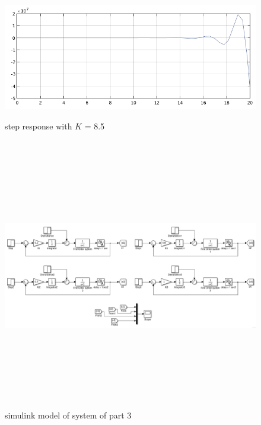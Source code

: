 \message{ !name(lab1.tex)}\documentclass[a4paper,12pt,openany]{book}
\begin{document}
 \begin{figure}[H]
  \includegraphics[width = 165mm, scale = 0.85]{lab03part2a5.png}
  \caption{step response with $K$ = 8.5}\\
  \vfil
 \includegraphics[width = 165mm, height = 110mm, scale = 0.85]{lab03part21.png}
 \caption{simulink model of system of part 3}
\end{figure}
\end{document}
